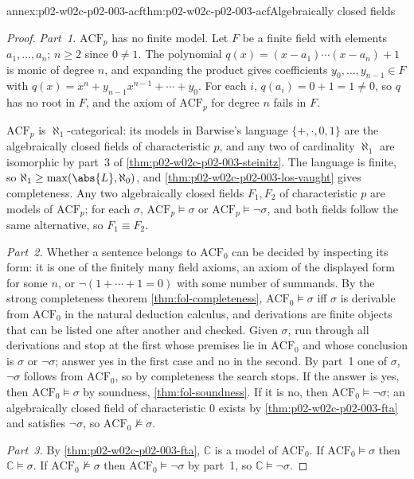 \begin{annexitem}{annex:p02-w02c-p02-003-acf}{thm:p02-w02c-p02-003-acf}{Algebraically closed fields}
\begin{proof}
\emph{Part~1.}  \(\mathrm{ACF}_p\) has no finite model.  Let \(F\) be a
finite field with elements \(a_1,\ldots,a_n\); \(n\geq2\) since
\(0\neq1\).  The polynomial
\(q(x)=(x-a_1)\cdots(x-a_n)+1\) is monic of degree \(n\), and expanding
the product gives coefficients \(y_0,\ldots,y_{n-1}\in F\) with
\(q(x)=x^n+y_{n-1}x^{n-1}+\cdots+y_0\).  For each \(i\),
\(q(a_i)=0+1=1\neq0\), so \(q\) has no root in \(F\), and the axiom of
\(\mathrm{ACF}_p\) for degree \(n\) fails in \(F\).

\(\mathrm{ACF}_p\) is \(\aleph_1\)-categorical: its models in Barwise's
language \(\{+,\cdot,0,1\}\) are the algebraically closed fields of
characteristic \(p\), and any two of cardinality \(\aleph_1\) are
isomorphic by part~3 of \cref{thm:p02-w02c-p02-003-steinitz}.  The language is finite,
so \(\aleph_1\geq\max(\abs{L},\aleph_0)\), and
\cref{thm:p02-w02c-p02-003-los-vaught} gives completeness.  Any two
algebraically closed fields \(F_1,F_2\) of characteristic \(p\) are models
of \(\mathrm{ACF}_p\); for each \(\sigma\), \(\mathrm{ACF}_p\models\sigma\)
or \(\mathrm{ACF}_p\models\neg\sigma\), and both fields follow the same
alternative, so \(F_1\equiv F_2\).

\emph{Part~2.}  Whether a sentence belongs to \(\mathrm{ACF}_0\) can be
decided by inspecting its form: it is one of the finitely many field
axioms, an axiom of the displayed form for some \(n\), or
\(\neg(1+\cdots+1=0)\) with some number of summands.  By the strong
completeness theorem \cref{thm:fol-completeness},
\(\mathrm{ACF}_0\models\sigma\) iff \(\sigma\) is derivable from
\(\mathrm{ACF}_0\) in the natural deduction calculus, and derivations are
finite objects that can be listed one after another and checked.  Given
\(\sigma\), run through all derivations and stop at the first whose
premises lie in \(\mathrm{ACF}_0\) and whose conclusion is \(\sigma\) or
\(\neg\sigma\); answer yes in the first case and no in the second.  By
part~1 one of \(\sigma\), \(\neg\sigma\) follows from \(\mathrm{ACF}_0\),
so by completeness the search stops.  If the answer is yes, then
\(\mathrm{ACF}_0\models\sigma\) by soundness, \cref{thm:fol-soundness}.  If it is no, then
\(\mathrm{ACF}_0\models\neg\sigma\); an algebraically closed field of
characteristic \(0\) exists by \cref{thm:p02-w02c-p02-003-fta} and
satisfies \(\neg\sigma\), so
\(\mathrm{ACF}_0\not\models\sigma\).

\emph{Part~3.}  By \cref{thm:p02-w02c-p02-003-fta}, \(\mathbb C\) is a
model of \(\mathrm{ACF}_0\).  If \(\mathrm{ACF}_0\models\sigma\) then
\(\mathbb C\models\sigma\).  If \(\mathrm{ACF}_0\not\models\sigma\) then
\(\mathrm{ACF}_0\models\neg\sigma\) by part~1, so
\(\mathbb C\models\neg\sigma\).
\end{proof}
\end{annexitem}

